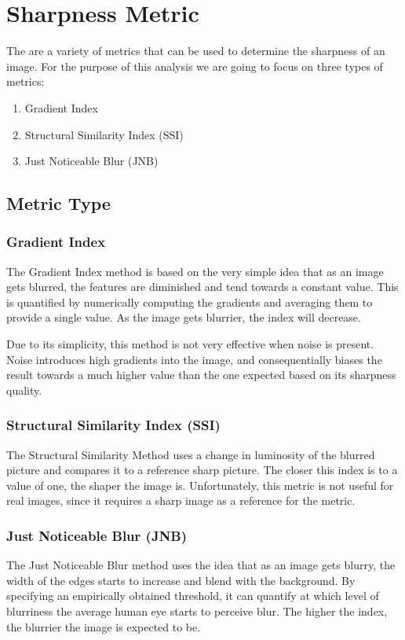 \graphicspath{{mehul_pics/}}%

\section{Sharpness Metric}

The are a variety of metrics that can be used to determine the sharpness of an image. For the purpose of this analysis we are going to focus on three types of metrics:
\begin{enumerate}
\item Gradient Index
\item Structural Similarity Index (SSI)
\item Just Noticeable  Blur (JNB)
\end{enumerate}  

\subsection{Metric Type}
\subsubsection{Gradient Index} 
The Gradient Index method is based on the very simple idea that as an image gets blurred, the features are diminished and tend towards a constant value. This is quantified by numerically computing the gradients and averaging them to provide a single value. As the image gets blurrier, the index will decrease. 

Due to its simplicity, this method is not very effective when noise is present. Noise introduces high gradients into the image, and consequentially biases the result towards a much higher value than the one expected based on its sharpness quality.  

\subsubsection{Structural Similarity Index (SSI)}
The Structural Similarity Method uses a change in luminosity of the blurred picture and compares it to a reference sharp picture. The closer this index is to a value of one, the shaper the image is. Unfortunately, this metric is not useful for real images, since it requires a sharp image as a reference for the metric.


\subsubsection{Just Noticeable Blur (JNB)~\cite{Ferzli:2009}}
The Just Noticeable Blur method uses the idea that as an image gets blurry, the width of the edges starts to increase and blend with the background. By specifying an empirically obtained threshold, it can quantify at which level of blurriness the average human eye starts to perceive blur. The higher the index, the blurrier the image is expected to be.

